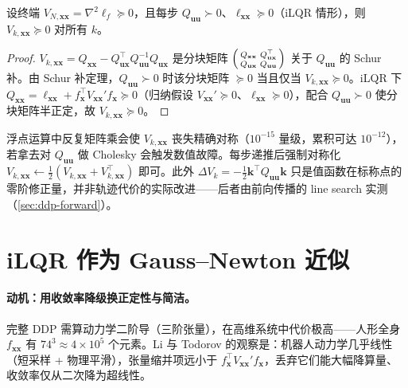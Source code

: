 \begin{theorem}
\label{thm:ddp-vxx-psd}
设终端 $V_{N,\mathbf{xx}}=\nabla^2\ell_f\succeq0$，且每步 $Q_{\mathbf{uu}}\succ0$、$\ell_{\mathbf{xx}}\succeq0$（iLQR 情形），则 $V_{k,\mathbf{xx}}\succeq0$ 对所有 $k$。
\end{theorem}
\begin{proof}
$V_{k,\mathbf{xx}}=Q_{\mathbf{xx}}-Q_{\mathbf{ux}}^\top Q_{\mathbf{uu}}^{-1}Q_{\mathbf{ux}}$ 是分块矩阵 $\begin{psmallmatrix}Q_{\mathbf{xx}}&Q_{\mathbf{ux}}^\top\\Q_{\mathbf{ux}}&Q_{\mathbf{uu}}\end{psmallmatrix}$ 关于 $Q_{\mathbf{uu}}$ 的 Schur 补。由 Schur 补定理，$Q_{\mathbf{uu}}\succ0$ 时该分块矩阵 $\succeq0$ 当且仅当 $V_{k,\mathbf{xx}}\succeq0$。iLQR 下 $Q_{\mathbf{xx}}=\ell_{\mathbf{xx}}+f_{\mathbf{x}}^\top V_{\mathbf{xx}}'f_{\mathbf{x}}\succeq0$（归纳假设 $V_{\mathbf{xx}}'\succeq0$、$\ell_{\mathbf{xx}}\succeq0$），配合 $Q_{\mathbf{uu}}\succ0$ 使分块矩阵半正定，故 $V_{k,\mathbf{xx}}\succeq0$。
\end{proof}

\begin{remark}
浮点运算中反复矩阵乘会使 $V_{k,\mathbf{xx}}$ 丧失精确对称（$10^{-15}$ 量级，累积可达 $10^{-12}$），若拿去对 $Q_{\mathbf{uu}}$ 做 Cholesky 会触发数值故障。每步递推后强制对称化 $V_{k,\mathbf{xx}}\leftarrow\tfrac12(V_{k,\mathbf{xx}}+V_{k,\mathbf{xx}}^\top)$ 即可。此外 $\Delta V_k=-\tfrac12\mathbf{k}^\top Q_{\mathbf{uu}}\mathbf{k}$ 只是值函数在标称点的零阶修正量，并非轨迹代价的实际改进——后者由前向传播的 line search 实测（\cref{sec:ddp-forward}）。
\end{remark}

\section{iLQR 作为 Gauss--Newton 近似}
\label{sec:ddp-ilqr-gn}

\paragraph{动机：用收敛率降级换正定性与简洁。}
完整 DDP 需算动力学二阶导（三阶张量），在高维系统中代价极高——人形全身 $f_{\mathbf{xx}}$ 有 $74^3\approx4\times10^5$ 个元素。Li 与 Todorov 的观察是：机器人动力学几乎线性（短采样 + 物理平滑），张量缩并项远小于 $f_{\mathbf{x}}^\top V_{\mathbf{xx}}'f_{\mathbf{x}}$，丢弃它们能大幅降算量、收敛率仅从二次降为超线性。

